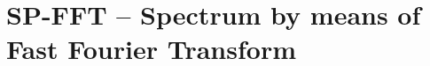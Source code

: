 \documentclass[12pt,a4paper,oneside]{report} %
\begin{document}
\section*{\infosection} %

\section*{\examplesection} %


\chapter{SP-FFT -- Spectrum by means of Fast Fourier Transform} %
\section*{\infosection} %

\section*{\examplesection} %

\end{document}
